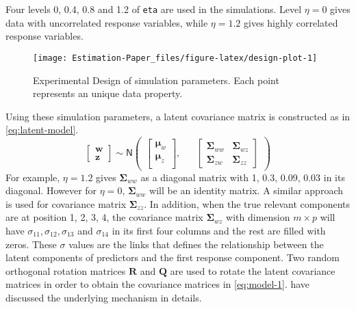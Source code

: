 \documentclass[12pt,3p,authoryear]{elsarticle}
\begin{document}
\begin{description}
Four levels 0, 0.4, 0.8 and 1.2 of \texttt{eta} are used in the simulations. Level \(\eta=0\) gives data with uncorrelated response variables, while \(\eta=1.2\) gives highly correlated response variables.
\end{description}

\begin{figure}
\texttt{[image: Estimation-Paper\_files/figure-latex/design-plot-1]} \caption{Experimental Design of simulation parameters. Each point represents an unique data property.}\label{fig:design-plot}
\end{figure}

Using these simulation parameters, a latent covariance matrix is constructed as in \ref{eq:latent-model}.
\begin{equation}
  \begin{bmatrix}
    \mathbf{w} \\ \mathbf{z}
  \end{bmatrix} 
  \sim \mathsf{N}
  \begin{pmatrix}
    \begin{bmatrix}
      \boldsymbol{\mu}_w \\
      \boldsymbol{\mu}_z \\
    \end{bmatrix}, &&
    \begin{bmatrix}
      \boldsymbol{\Sigma}_{ww} & \boldsymbol{\Sigma}_{wz} \\
      \boldsymbol{\Sigma}_{zw} & \boldsymbol{\Sigma}_{zz} 
    \end{bmatrix}
  \end{pmatrix}
  \label{eq:latent-model}
\end{equation}
For example, \(\eta=1.2\) gives \(\boldsymbol{\Sigma}_{ww}\) as a diagonal matrix with 1, 0.3, 0.09, 0.03 in its diagonal. However for \(\eta=0\), \(\boldsymbol{\Sigma}_{ww}\) will be an identity matrix. A similar approach is used for covariance matrix \(\boldsymbol{\Sigma}_{zz}\). In addition, when the true relevant components are at position 1, 2, 3, 4, the covariance matrix \(\boldsymbol{\Sigma}_{wz}\) with dimension \(m \times p\) will have \(\sigma_{11}, \sigma_{12}, \sigma_{13}\) and \(\sigma_{14}\) in its first four columns and the rest are filled with zeros. These \(\sigma\) values are the links that defines the relationship between the latent components of predictors and the first response component. Two random orthogonal rotation matrices \(\mathbf{R}\) and \(\mathbf{Q}\) are used to rotate the latent covariance matrices in order to obtain the covariance matrices in \ref{eq:model-1}. \citet{Rimal2018} have discussed the underlying mechanism in details.
\end{document}
